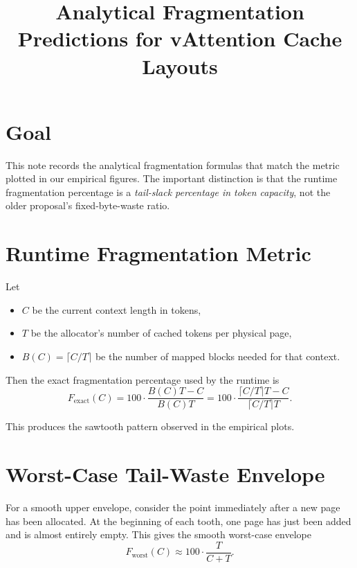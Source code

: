 \documentclass[11pt]{article}
\title{Analytical Fragmentation Predictions for vAttention Cache Layouts}
\author{}
\date{}
\begin{document}
\maketitle

\section{Goal}

This note records the analytical fragmentation formulas that match the metric plotted in our empirical figures.
The important distinction is that the runtime fragmentation percentage is a \emph{tail-slack percentage in token capacity}, not the older proposal's fixed-byte-waste ratio.

\section{Runtime Fragmentation Metric}

Let
\begin{itemize}
    \item $C$ be the current context length in tokens,
    \item $T$ be the allocator's number of cached tokens per physical page,
    \item $B(C) = \lceil C/T \rceil$ be the number of mapped blocks needed for that context.
\end{itemize}

Then the exact fragmentation percentage used by the runtime is
\begin{equation}
F_{\text{exact}}(C)
= 100 \cdot \frac{B(C)T - C}{B(C)T}
= 100 \cdot \frac{\lceil C/T \rceil T - C}{\lceil C/T \rceil T}.
\end{equation}

This produces the sawtooth pattern observed in the empirical plots.

\section{Worst-Case Tail-Waste Envelope}

For a smooth upper envelope, consider the point immediately after a new page has been allocated.
At the beginning of each tooth, one page has just been added and is almost entirely empty.
This gives the smooth worst-case envelope
\begin{equation}
F_{\text{worst}}(C)
\approx 100 \cdot \frac{T}{C + T}.
\end{equation}
\end{document}
